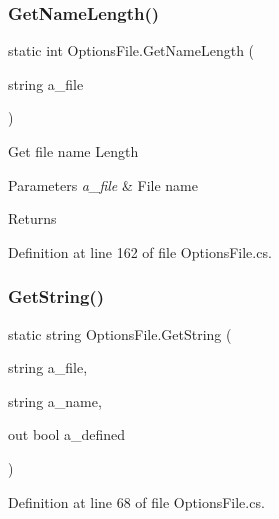 \subsubsection{\texorpdfstring{Get\+Name\+Length()}{GetNameLength()}}
{\footnotesize\ttfamily static int Options\+File.\+Get\+Name\+Length (\begin{DoxyParamCaption}\item[{string}]{a\+\_\+file }\end{DoxyParamCaption})\hspace{0.3cm}{\ttfamily [static]}}



Get file name Length 


\begin{DoxyParams}{Parameters}
{\em a\+\_\+file} & File name\\
\hline
\end{DoxyParams}
\begin{DoxyReturn}{Returns}

\end{DoxyReturn}


Definition at line 162 of file Options\+File.\+cs.

\mbox{\label{class_options_file_ac4a1f6e33de1e7e8bb453ab8597b2258}} 
\subsubsection{\texorpdfstring{Get\+String()}{GetString()}}
{\footnotesize\ttfamily static string Options\+File.\+Get\+String (\begin{DoxyParamCaption}\item[{string}]{a\+\_\+file,  }\item[{string}]{a\+\_\+name,  }\item[{out bool}]{a\+\_\+defined }\end{DoxyParamCaption})\hspace{0.3cm}{\ttfamily [static]}}



Definition at line 68 of file Options\+File.\+cs.

\mbox{\label{class_options_file_abdab0a1c6e374b7fde7967ceb8ec13b6}} 
